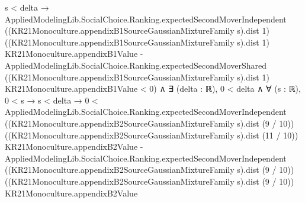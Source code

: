 \documentclass[10pt]{article}
\begin{document}
\begin{ReviewVerbatim}
                              s < delta →
                                AppliedModelingLib.SocialChoice.Ranking.expectedSecondMoverIndependent
                                      ((KR21Monoculture.appendixB1SourceGaussianMixtureFamily s).dist 1)
                                      ((KR21Monoculture.appendixB1SourceGaussianMixtureFamily s).dist 1)
                                      KR21Monoculture.appendixB1Value -
                                    AppliedModelingLib.SocialChoice.Ranking.expectedSecondMoverShared
                                      ((KR21Monoculture.appendixB1SourceGaussianMixtureFamily s).dist 1)
                                      KR21Monoculture.appendixB1Value <
                                  0) ∧
                      ∃ (delta : ℝ),
                        0 < delta ∧
                          ∀ (s : ℝ),
                            0 < s →
                              s < delta →
                                0 <
                                  AppliedModelingLib.SocialChoice.Ranking.expectedSecondMoverIndependent
                                      ((KR21Monoculture.appendixB2SourceGaussianMixtureFamily s).dist (9 / 10))
                                      ((KR21Monoculture.appendixB2SourceGaussianMixtureFamily s).dist (11 / 10))
                                      KR21Monoculture.appendixB2Value -
                                    AppliedModelingLib.SocialChoice.Ranking.expectedSecondMoverIndependent
                                      ((KR21Monoculture.appendixB2SourceGaussianMixtureFamily s).dist (9 / 10))
                                      ((KR21Monoculture.appendixB2SourceGaussianMixtureFamily s).dist (9 / 10))
                                      KR21Monoculture.appendixB2Value
\end{ReviewVerbatim}
\end{document}
